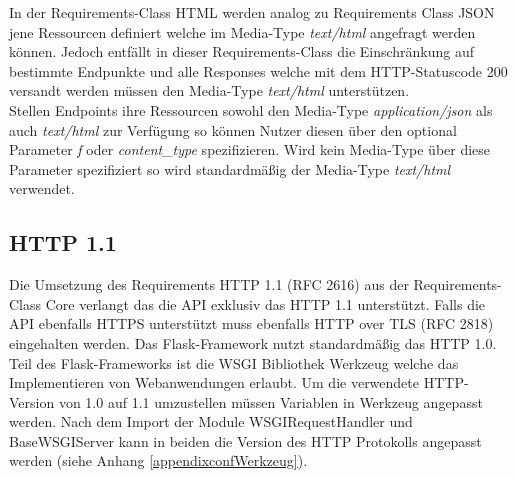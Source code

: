 In der Requirements-Class HTML werden analog zu Requirements Class JSON jene Ressourcen definiert welche im Media-Type \textit{text/html} angefragt werden können. Jedoch
entfällt in dieser Requirements-Class die Einschränkung auf bestimmte Endpunkte und alle Responses welche mit dem HTTP-Statuscode 200 versandt werden müssen den 
Media-Type \textit{text/html} unterstützen.\\
Stellen Endpoints ihre Ressourcen sowohl den Media-Type \textit{application/json} als auch \textit{text/html} zur Verfügung so können Nutzer diesen über den optional Parameter
\textit{f} oder \textit{content\_type} spezifizieren. Wird kein Media-Type über diese Parameter spezifiziert so wird standardmäßig der Media-Type \textit{text/html} verwendet. \\

\subsection{HTTP 1.1}
Die Umsetzung des Requirements HTTP 1.1 (RFC 2616) aus der Requirements-Class Core verlangt das die API exklusiv das HTTP 1.1 unterstützt. 
Falls die API ebenfalls HTTPS unterstützt muss ebenfalls HTTP over TLS (RFC 2818) eingehalten werden. 
Das Flask-Framework nutzt standardmäßig das HTTP 1.0. Teil des Flask-Frameworks ist die WSGI Bibliothek Werkzeug welche
das Implementieren von Webanwendungen erlaubt. Um die verwendete HTTP-Version von 1.0 auf 1.1 umzustellen müssen Variablen 
in Werkzeug angepasst werden. Nach dem Import der Module WSGIRequestHandler und BaseWSGIServer kann in beiden die 
Version des HTTP Protokolls angepasst werden (siehe Anhang \ref{appendixconfWerkzeug}). 

